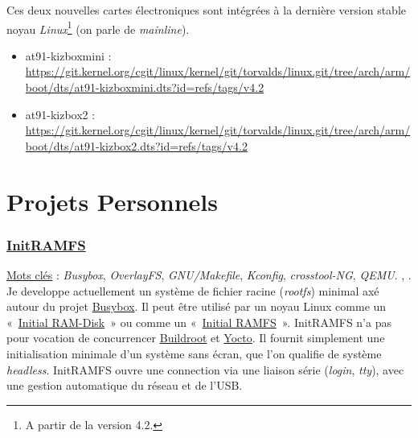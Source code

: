 \documentclass[a4paper]{article}
\begin{document}
Ces deux nouvelles cartes électroniques sont intégrées à la dernière version stable noyau \textit{Linux}\footnote{A partir de la version 4.2.} (on parle de \textit{mainline}).
\begin{itemize}
\item at91-kizboxmini : \url{https://git.kernel.org/cgit/linux/kernel/git/torvalds/linux.git/tree/arch/arm/boot/dts/at91-kizboxmini.dts?id=refs/tags/v4.2}
\item at91-kizbox2 : \url{https://git.kernel.org/cgit/linux/kernel/git/torvalds/linux.git/tree/arch/arm/boot/dts/at91-kizbox2.dts?id=refs/tags/v4.2}
\end{itemize}
\clearpage

\part{Projets Personnels}

\section{\href{https://github.com/gazoo74/initramfs/}{InitRAMFS}}

\underline{Mots clés} : \textit{Busybox}, \textit{OverlayFS}, \textit{GNU/Makefile}, \textit{Kconfig}, \textit{crosstool-NG}, \textit{QEMU}. , \textit{}.\\

Je developpe actuellement un système de fichier racine (\textit{rootfs}) minimal axé autour du projet \href{http://www.busybox.net/}{Busybox}. Il peut être utilisé par un noyau Linux comme un «~\href{https://www.kernel.org/doc/Documentation/initrd.txt}{Initial RAM-Disk}~» ou comme un «~\href{https://www.kernel.org/doc/Documentation/filesystems/ramfs-rootfs-initramfs.txt}{Initial RAMFS}~». InitRAMFS n'a pas pour vocation de concurrencer \href{http://buildroot.org/}{Buildroot} et \href{https://www.yoctoproject.org/}{Yocto}. Il fournit simplement une initialisation minimale d'un système sans écran, que l'on qualifie de système \textit{headless}. InitRAMFS ouvre une connection via une liaison série (\textit{login}, \textit{tty}), avec une gestion automatique du réseau et de l'USB.\\
\end{document}
